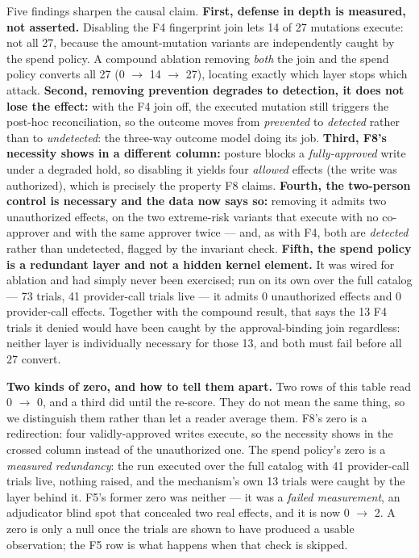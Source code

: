 \documentclass[11pt]{article}
\begin{document}
Five findings sharpen the causal claim. \textbf{First, defense in depth is measured, not
asserted.} Disabling the F4 fingerprint join lets 14 of 27 mutations execute: not all 27,
because the amount-mutation variants are independently caught by the spend policy. A compound
ablation removing \emph{both} the join and the spend policy converts all 27 (0 $\rightarrow$ 14 $\rightarrow$ 27), locating
exactly which layer stops which attack. \textbf{Second, removing prevention degrades to detection,
it does not lose the effect:} with the F4 join off, the executed mutation still triggers the
post-hoc reconciliation, so the outcome moves from \emph{prevented} to \emph{detected} rather than to
\emph{undetected}: the three-way outcome model doing its job. \textbf{Third, F8's necessity shows in a
different column:} posture blocks a \emph{fully-approved} write under a degraded hold, so disabling
it yields four \emph{allowed} effects (the write was authorized), which is precisely the property
F8 claims. \textbf{Fourth, the two-person control is necessary and the data now says so:} removing
it admits two unauthorized effects, on the two extreme-risk variants that execute with no
co-approver and with the same approver twice --- and, as with F4, both are \emph{detected} rather
than undetected, flagged by the invariant check. \textbf{Fifth, the spend policy is a redundant layer
and not a hidden kernel element.} It was wired for ablation and had simply never been exercised;
run on its own over the full catalog --- 73 trials, 41 provider-call trials live --- it admits 0
unauthorized effects and 0 provider-call effects.
Together with the compound result, that says the 13 F4 trials it denied would have been caught by
the approval-binding join regardless: neither layer is individually necessary for those 13, and
both must fail before all 27 convert.

\textbf{Two kinds of zero, and how to tell them apart.} Two rows of this table read
0 $\rightarrow$ 0, and a third did until the re-score. They do not mean the same thing, so we
distinguish them rather than let a reader average them. F8's zero is a redirection: four validly-approved writes execute, so the
necessity shows in the crossed column instead of the unauthorized one. The spend policy's zero is a
\emph{measured redundancy}: the run executed over the full catalog with 41 provider-call trials
live, nothing raised, and the mechanism's own 13 trials were caught by the layer behind it. F5's
former zero was neither --- it
was a \emph{failed measurement}, an adjudicator blind spot that concealed two real effects, and it
is now 0 $\rightarrow$ 2. A zero is only a null once the trials are shown to have produced a usable
observation; the F5 row is what happens when that check is skipped.
\end{document}
